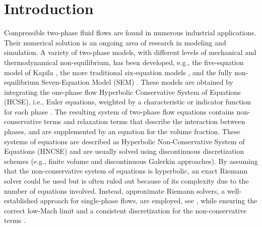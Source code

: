 \section{Introduction}\label{sec:intro}
%
Compressible two-phase fluid flows are found in numerous industrial applications. Their numerical solution is an ongoing area of research 
in modeling and simulation. 
A variety of two-phase models, with different levels of mechanical and thermodynamical non-equilibrium, has been developed, e.g., 
the five-equation model of Kapila \cite{Kapila_2001,GuillardMurrone2003,Saurel_2009}, 
the more traditional six-equation models \cite{Stadtke}, 
and the fully non-equilibrium Seven-Equation Model (SEM) \cite{Berry_1985,BaerNunziato,Saurel_2001b,SEM}. 
These models are obtained by integrating the one-phase flow Hyperbolic Conservative System of Equations (HCSE), 
  
i.e., Euler equations, weighted by a characteristic or indicator function for each phase \cite{DrewPassman,SEM}.
The resulting system of two-phase flow equations contains non-conservative terms and relaxation terms that 
describe the interaction between phases, and are supplemented by an equation for the volume fraction. 
These systems of equations are described as Hyperbolic Non-Conservative System of Equations (HNCSE) 
and are usually solved using discontinuous discretization schemes (e.g., finite volume and discontinuous 
Galerkin approaches). By assuming that the non-conservative system of equations is hyperbolic, an exact Riemann solver 
could be used but is often ruled out because of its complexity due to the number of equations involved. 
Instead, approximate Riemann solvers, a well-established approach for single-phase flows, are employed, 
see \cite{Saurel_2001a,Saurel_2001b,Li_2004,Zein_2010,Ambroso_2012}, while ensuring the correct 
low-Mach limit and a consistent discretization for the non-conservative terms \cite{Li_2004,Abgrall_2002}.

